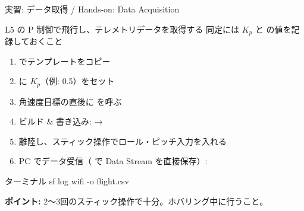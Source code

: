 \begin{frame}[fragile]{実習: データ取得 / Hands-on: Data Acquisition}
  \begin{block}{L5 の P 制御で飛行し、テレメトリデータを取得する}
    {\footnotesize 同定には $K_p$ と  の値を記録しておくこと}
  \end{block}

  \vspace{0.5em}

  \begin{enumerate}
    \item {} でテンプレートをコピー
    \item {} に $K_p$（例: 0.5）をセット
    \item 角速度目標の直後に  を呼ぶ
    \item ビルド \& 書き込み:  → 
    \item 離陸し、スティック操作でロール・ピッチ入力を入れる
    \item PC でデータ受信（ で Data Stream を直接保存）:
  \end{enumerate}

  \begin{sflisting}{ターミナル}
sf log wifi -o flight.csv
  \end{sflisting}

  \vspace{0.5em}

  {\small \textbf{ポイント:} 2〜3回のスティック操作で十分。ホバリング中に行うこと。}
\end{frame}

